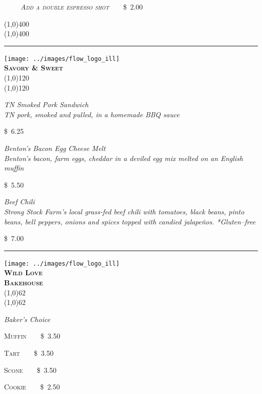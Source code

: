 \documentclass[letterpaper, 12pt]{article}%
\newcommand{\ill}{
\texttt{[image: ../images/flow\_logo\_ill]} %
}
\newcommand{\menuentry}[2]{
 \emph{#1}\\ %
 \vspace*{\fill}
 {#2} %
}
\newcommand{\menuitem}[4]{
 \centering
  \ill\\
  \smallskip\vspace{0.1em}
  \textbf{\sffamily \textsc{\large#2}}\vspace{-1ex}\\
  \line(1,0){#1}\vspace{-2ex}\\
  \line(1,0){#1}\vspace{0.5ex}\\
  \smallskip
  \menuentry{#3}{#4}
}
\newcommand{\flowtherefore}{~~\raisebox{0.2ex}{$\therefore$}~~}
\newcommand{\price}[2]{
 \textsc{\small#1}\flowtherefore\$~\textsc{\small#2}
}
\newcommand{\varprice}[1]{
 \$~\textsc{\small#1}
}
\newcommand{\heading}[1]{{\large\bfseries #1\par}}
\newcommand{\flowentry}[1]{
{\calligra\centering\heading{\Huge #1}\vspace{-2ex}

\line(1,0){400}\vspace{-3ex}\\
\line(1,0){400}\vspace{-2ex}

}}
\begin{document}
\vspace{0.5em}

{\centering
 \textbf{\textup{\normalsize{}}} \flowtherefore \price{\textrm{\emph{\normalsize Add a double espresso shot}}}{2.00}

}

\flowentry{}


\newlength{\ssminihi}
\newlength{\ssminiwi}
\newlength{\wlminiwi}
\setlength{\ssminihi}{0.36\textwidth}
\setlength{\ssminiwi}{0.56\textwidth}
\setlength{\wlminiwi}{0.19\textwidth}
\rule{1.2cm}{0pt}
\begin{minipage}[t][\ssminihi][b]{\ssminiwi}
 \menuitem{120}{
  Savory \& Sweet}{
  \textup{\normalsize TN Smoked Pork Sandwich}\\
  {\footnotesize TN pork, smoked and pulled, in a homemade BBQ sauce}
  }{
  \varprice{6.25}
 }\vspace{1.5ex}
 
 \menuentry{
  \textup{\normalsize Benton's Bacon Egg Cheese Melt}\\
  {\footnotesize Benton's bacon, farm eggs, cheddar in a deviled egg mix melted on an English muffin}
  }{
  \varprice{5.50}
 }\vspace{1.5ex}
 
  \menuentry{
  \textup{\normalsize Beef Chili}\\
  {\footnotesize Strong Stock Farm's local grass-fed beef chili with tomatoes, black beans, pinto beans, bell peppers, onions and spices topped with candied jalape\~{n}os. *Gluten--free}
  }{
  \varprice{7.00}
 }
\end{minipage}
\rule{1em}{0pt}
\begin{minipage}[t][0.8\ssminihi][b]{\wlminiwi}
 \menuitem{62}{Wild Love\\Bakehouse}{
  \textup{\normalsize Baker's Choice}\vspace{1ex}
  }{
  \price{Muffin}{3.50}
  
  \price{Tart}{3.50}
  
  \price{Scone}{3.50}
  
  \price{Cookie}{2.50}
  
 }
\end{minipage}
\end{document}
